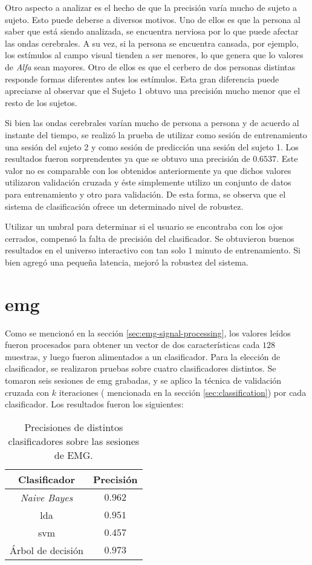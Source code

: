 Otro aspecto a analizar es el hecho de que la precisión varía mucho de sujeto a sujeto. Esto puede deberse a diversos motivos. Uno de ellos es que la persona al saber que está siendo analizada, se encuentra nerviosa por lo que puede afectar las ondas cerebrales. A su vez, si la persona se encuentra cansada, por ejemplo, los estímulos al campo visual tienden a ser menores, lo que genera que lo valores de \emph{Alfa} sean mayores. Otro de ellos es que el cerbero de dos personas distintas responde formas diferentes antes los estímulos. Esta gran diferencia puede apreciarse al observar que el Sujeto $1$ obtuvo una precisión mucho menor que el resto de los sujetos.

Si bien las ondas cerebrales varían mucho de persona a persona y de acuerdo al instante del tiempo, se realizó la prueba de utilizar como sesión de entrenamiento una sesión del sujeto 2  y como sesión de predicción una sesión del sujeto 1. Los resultados fueron sorprendentes ya que se obtuvo una precisión de $0.6537$. Este valor no es comparable con los obtenidos anteriormente ya que dichos valores utilizaron validación cruzada y éste simplemente utilizo un conjunto de datos para entrenamiento y otro para validación. De esta forma, se observa que el sistema de clasificación ofrece un determinado nivel de robustez.

Utilizar un umbral para determinar si el usuario se encontraba con los ojos cerrados, compensó la falta de precisión del clasificador. Se obtuvieron buenos resultados en el universo interactivo con tan solo $1$ minuto de entrenamiento. Si bien agregó una pequeña latencia, mejoró la robustez del sistema.

\section{\acrshort{emg}} \label{sec:emg-results}

Como se mencionó en la sección \ref{sec:emg-signal-processing}, los valores leídos fueron procesados para obtener un vector de dos características cada $128$ muestras, y luego fueron alimentados a un clasificador. Para la elección de clasificador, se realizaron pruebas sobre cuatro clasificadores distintos. Se tomaron seis sesiones de \acrshort{emg} grabadas, y se aplico la técnica de validación cruzada con $k$ iteraciones ( mencionada en la sección \ref{sec:classification}) por cada clasificador. Los resultados fueron los siguientes:

\begin{table}[H]
\centering
\begin{tabular}{ |c|c| }
 \hline
 Clasificador & Precisión \\ 
 \hline
 \emph{Naive Bayes} & $0.962$ \\
 \hline
 \gls{lda} & $0.951$ \\
 \hline
  \gls{svm} & $0.457$ \\
 \hline
 Árbol de decisión & $0.973$ \\
 
 \hline
\end{tabular}
\caption{Precisiones de distintos clasificadores sobre las sesiones de EMG.}
\label{tab:emg-classifiers}
\end{table}

